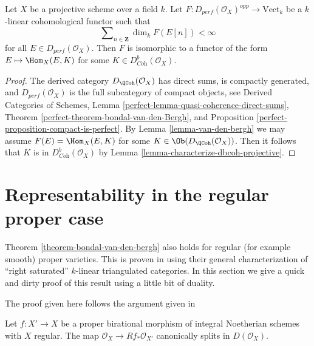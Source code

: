 \begin{theorem}
\label{theorem-bondal-van-den-bergh}
\begin{reference}
\cite[Theorem A.1]{BvdB}
\end{reference}
Let $X$ be a projective scheme over a field $k$.
Let $F : D_{perf}(\mathcal{O}_X)^{opp} \to \text{Vect}_k$
be a $k$-linear cohomological functor such that
$$
\sum\nolimits_{n \in \mathbf{Z}} \dim_k F(E[n]) < \infty
$$
for all $E \in D_{perf}(\mathcal{O}_X)$. Then $F$ is isomorphic to a functor
of the form $E \mapsto \Hom_X(E, K)$ for some
$K \in D^b_{\textit{Coh}}(\mathcal{O}_X)$.
\end{theorem}

\begin{proof}
The derived category $D_\QCoh(\mathcal{O}_X)$ has direct sums,
is compactly generated, and $D_{perf}(\mathcal{O}_X)$ is the full subcategory
of compact objects, see
Derived Categories of Schemes, Lemma
\ref{perfect-lemma-quasi-coherence-direct-sums},
Theorem \ref{perfect-theorem-bondal-van-den-Bergh}, and
Proposition \ref{perfect-proposition-compact-is-perfect}.
By Lemma \ref{lemma-van-den-bergh} we may assume
$F(E) = \Hom_X(E, K)$ for some $K \in \Ob(D_\QCoh(\mathcal{O}_X))$.
Then it follows that $K$ is in $D^b_{\textit{Coh}}(\mathcal{O}_X)$
by Lemma \ref{lemma-characterize-dbcoh-projective}.
\end{proof}




\section{Representability in the regular proper case}
\label{section-regular-proper}

\noindent
Theorem \ref{theorem-bondal-van-den-bergh}
also holds for regular (for example smooth) proper varieties. This
is proven in \cite{BvdB} using their general characterization
of ``right saturated'' $k$-linear triangulated categories. In this
section we give a quick and dirty proof of this result using a little
bit of duality.

\begin{lemma}
\label{lemma-trace-map}
\begin{reference}
The proof given here follows the argument given in
\cite[Remark 3.4]{MS}
\end{reference}
Let $f : X' \to X$ be a proper birational morphism of integral Noetherian
schemes with $X$ regular. The map $\mathcal{O}_X \to Rf_*\mathcal{O}_{X'}$
canonically splits in $D(\mathcal{O}_X)$.
\end{lemma}

